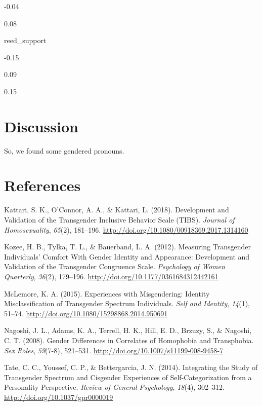 \documentclass[12pt,twoside]{reedthesis}
\newlength{\cslhangindent}
\newenvironment{cslreferences}%
  {\setlength{\parindent}{0pt}%
  \everypar{\setlength{\hangindent}{\cslhangindent}}\ignorespaces}%
  {\par}
\begin{document}
{-0.04}

{0.08}

reed\_support

{-0.15}

{0.09}

{0.15}

\hypertarget{discussion}{%
\chapter{Discussion}\label{discussion}}

So, we found some gendered pronouns.

\appendix

\backmatter

\hypertarget{references}{%
\chapter*{References}\label{references}}


\noindent

\setlength{\parindent}{-0.20in}
\setlength{\leftskip}{0.20in}
\setlength{\parskip}{8pt}

\hypertarget{refs}{}
\begin{cslreferences}
\leavevmode\hypertarget{ref-kattariDevelopmentValidationTransgender2018}{}%
Kattari, S. K., O'Connor, A. A., \& Kattari, L. (2018). Development and Validation of the Transgender Inclusive Behavior Scale (TIBS). \emph{Journal of Homosexuality}, \emph{65}(2), 181--196. \url{http://doi.org/10.1080/00918369.2017.1314160}

\leavevmode\hypertarget{ref-kozeeMeasuringTransgenderIndividuals2012}{}%
Kozee, H. B., Tylka, T. L., \& Bauerband, L. A. (2012). Measuring Transgender Individuals' Comfort With Gender Identity and Appearance: Development and Validation of the Transgender Congruence Scale. \emph{Psychology of Women Quarterly}, \emph{36}(2), 179--196. \url{http://doi.org/10.1177/0361684312442161}

\leavevmode\hypertarget{ref-mclemoreExperiencesMisgenderingIdentity2015}{}%
McLemore, K. A. (2015). Experiences with Misgendering: Identity Misclassification of Transgender Spectrum Individuals. \emph{Self and Identity}, \emph{14}(1), 51--74. \url{http://doi.org/10.1080/15298868.2014.950691}

\leavevmode\hypertarget{ref-nagoshiGenderDifferencesCorrelates2008}{}%
Nagoshi, J. L., Adams, K. A., Terrell, H. K., Hill, E. D., Brzuzy, S., \& Nagoshi, C. T. (2008). Gender Differences in Correlates of Homophobia and Transphobia. \emph{Sex Roles}, \emph{59}(7-8), 521--531. \url{http://doi.org/10.1007/s11199-008-9458-7}

\leavevmode\hypertarget{ref-tateIntegratingStudyTransgender2014}{}%
Tate, C. C., Youssef, C. P., \& Bettergarcia, J. N. (2014). Integrating the Study of Transgender Spectrum and Cisgender Experiences of Self-Categorization from a Personality Perspective. \emph{Review of General Psychology}, \emph{18}(4), 302--312. \url{http://doi.org/10.1037/gpr0000019}
\end{cslreferences}

\end{document}
